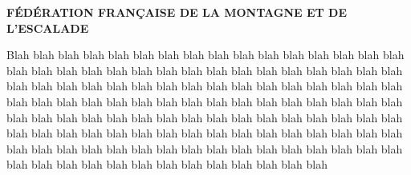 \documentclass{report}
\begin{document}
\begin{center}
\sf\bfseries
F\'ED\'ERATION FRAN\c{C}AISE DE LA MONTAGNE ET DE L'ESCALADE
\end{center}


Blah blah blah blah blah blah blah blah blah blah blah blah blah blah blah blah blah
blah blah blah blah blah blah blah blah blah blah blah blah blah blah blah blah blah blah
blah blah blah blah blah blah blah blah blah blah blah blah blah blah blah blah blah blah
blah blah blah blah blah blah blah blah blah blah blah blah blah blah blah blah blah blah
blah blah blah blah blah blah blah blah blah blah blah blah blah blah blah blah blah blah
blah blah blah blah blah blah blah blah blah blah blah blah blah blah blah blah blah blah
blah blah blah blah blah blah blah blah blah blah blah blah blah blah blah blah blah blah
\end{document}
